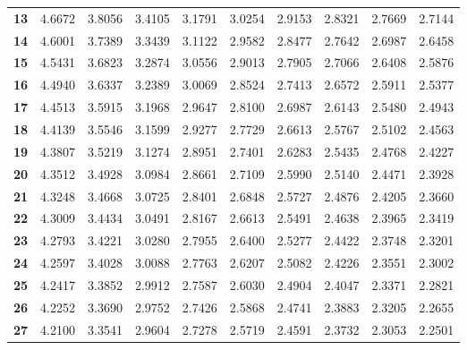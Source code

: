 \begin{center}
\begin{tabular}{c|c|c|c|c|c|c|c|c|c}
\textbf{13}  & 4.6672     & 3.8056     & 3.4105     & 3.1791     & 3.0254     & 2.9153     & 2.8321     & 2.7669     & 2.7144         \\
\textbf{14}  & 4.6001     & 3.7389     & 3.3439     & 3.1122     & 2.9582     & 2.8477     & 2.7642     & 2.6987     & 2.6458          \\
\textbf{15}  & 4.5431     & 3.6823     & 3.2874     & 3.0556     & 2.9013     & 2.7905     & 2.7066     & 2.6408     & 2.5876         \\
\textbf{16}  & 4.4940     & 3.6337     & 3.2389     & 3.0069     & 2.8524     & 2.7413     & 2.6572     & 2.5911     & 2.5377     \\
\textbf{17}  & 4.4513     & 3.5915     & 3.1968     & 2.9647     & 2.8100     & 2.6987     & 2.6143     & 2.5480     & 2.4943          \\
\textbf{18}  & 4.4139     & 3.5546     & 3.1599     & 2.9277     & 2.7729     & 2.6613     & 2.5767     & 2.5102     & 2.4563         \\
\textbf{19}  & 4.3807     & 3.5219     & 3.1274     & 2.8951     & 2.7401     & 2.6283     & 2.5435     & 2.4768     & 2.4227           \\
\textbf{20}  & 4.3512     & 3.4928     & 3.0984     & 2.8661     & 2.7109     & 2.5990     & 2.5140     & 2.4471     & 2.3928           \\
\textbf{21}  & 4.3248     & 3.4668     & 3.0725     & 2.8401     & 2.6848     & 2.5727     & 2.4876     & 2.4205     & 2.3660           \\
\textbf{22}  & 4.3009     & 3.4434     & 3.0491     & 2.8167     & 2.6613     & 2.5491     & 2.4638     & 2.3965     & 2.3419          \\
\textbf{23}  & 4.2793     & 3.4221     & 3.0280     & 2.7955     & 2.6400     & 2.5277     & 2.4422     & 2.3748     & 2.3201          \\
\textbf{24}  & 4.2597     & 3.4028     & 3.0088     & 2.7763     & 2.6207     & 2.5082     & 2.4226     & 2.3551     & 2.3002          \\
\textbf{25}  & 4.2417     & 3.3852     & 2.9912     & 2.7587     & 2.6030     & 2.4904     & 2.4047     & 2.3371     & 2.2821         \\
\textbf{26}  & 4.2252     & 3.3690     & 2.9752     & 2.7426     & 2.5868     & 2.4741     & 2.3883     & 2.3205     & 2.2655          \\
\textbf{27}  & 4.2100     & 3.3541     & 2.9604     & 2.7278     & 2.5719     & 2.4591     & 2.3732     & 2.3053     & 2.2501          \\

\end{tabular}
\end{center}
